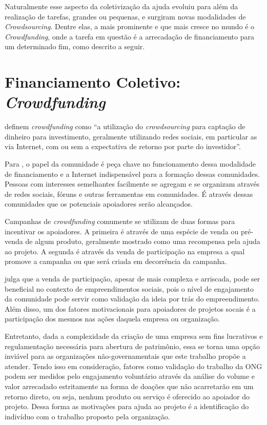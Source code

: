 Naturalmente esse aspecto da coletivização da ajuda evoluiu para além da realização de tarefas, grandes ou pequenas, e surgiram novas modalidades de \emph{Crowdsourcing}. Dentre elas, a mais prominente e que mais cresce no mundo é o \emph{Crowdfunding}, onde a tarefa em questão é a arrecadação de financiamento para um determinado fim, como descrito a seguir.



\section{Financiamento Coletivo: \emph{Crowdfunding}} \label{sec:fundamentacao:financiamento}
\citeauthor{belleflamme2010} definem \emph{crowdfunding} como ``a utilização do \emph{crowdsourcing} para captação de dinheiro para investimento, geralmente utilizando redes sociais, em particular as via Internet, com ou sem a expectativa de retorno por parte do investidor''.

Para \citeauthor{golan2015crowdfunding}, o papel da comunidade é peça chave no funcionamento dessa modalidade de financiamento e a Internet indispensável para a formação dessas comunidades. Pessoas com interesses semelhantes facilmente se agregam e se organizam através de redes sociais, fóruns e outras ferramentas em comunidades. É através dessas comunidades que os potenciais apoiadores serão alcançados.

Campanhas de \emph{crowdfunding} comumente se utilizam de duas formas para incentivar os apoiadores\cite{belleflamme2014crowdfunding}. A primeira é através de uma espécie de venda ou pré-venda de algum produto, geralmente mostrado como uma recompensa pela ajuda ao projeto. A segunda é através da venda de participação na empresa a qual promove a campanha ou que será criada em decorrência da campanha.

\citeauthor{lehner2013crowdfunding} julga que a venda de participação, apesar de mais complexa e arriscada, pode ser beneficial no contexto de empreendimentos sociais, pois o nível de engajamento da comunidade pode servir como validação da ideia por trás do empreendimento. Além disso, um dos fatores motivacionais para apoiadores de projetos socais é a participação dos mesmos nas ações daquela empresa ou organização.

Entretanto, dada a complexidade da criação de uma empresa sem fins lucrativos e regulamentação necessária para abertura de patrimônio, essa se torna uma opção inviável para as organizações não-governamentais que este trabalho propõe a atender. Tendo isso em consideração, fatores como validação do trabalho da ONG podem ser medidos pelo engajamento voluntário através da análise do volume e valor arrecadado estritamente na forma de doações que não acarretarão em um retorno direto, ou seja, nenhum produto ou serviço é oferecido ao apoiador do projeto. Dessa forma as motivações para ajuda ao projeto é a identificação do indivíduo com o trabalho proposto pela organização.


